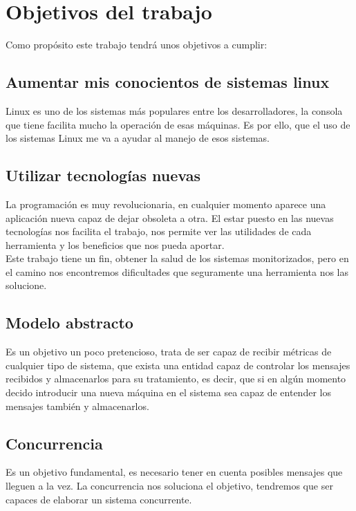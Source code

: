 \documentclass[ spanish, a4paper, 12pt, oneside]{report}
\begin{document}
\section{Objetivos del trabajo}
Como propósito este trabajo tendrá unos objetivos a cumplir:\\

\subsection{Aumentar mis conocientos de sistemas linux}
Linux es uno de los sistemas más populares entre los desarrolladores, la consola que tiene facilita mucho la operación de esas 
máquinas. Es por ello, que el uso de los sistemas Linux me va a ayudar al manejo de esos sistemas.\\

\subsection{Utilizar tecnologías nuevas}
La programación es muy revolucionaria, en cualquier momento aparece una aplicación nueva capaz de dejar obsoleta a otra. 
El estar puesto en las nuevas tecnologías nos facilita el trabajo, nos permite ver las utilidades de cada herramienta y los
beneficios que nos pueda aportar. \\

Este trabajo tiene un fin, obtener la salud de los sistemas monitorizados, pero en el camino nos encontremos dificultades que 
seguramente una herramienta nos las solucione. \\

\subsection{Modelo abstracto}
Es un objetivo un poco pretencioso, trata de ser capaz de recibir métricas de cualquier tipo de sistema, que exista una entidad
capaz de controlar los mensajes recibidos y almacenarlos para su tratamiento, es decir, que si en algún momento decido introducir 
una nueva máquina en el sistema sea capaz de entender los mensajes también y almacenarlos. \\

\subsection{Concurrencia}
Es un objetivo fundamental, es necesario tener en cuenta posibles mensajes que lleguen a la vez. La concurrencia nos soluciona el 
objetivo, tendremos que ser capaces de elaborar un sistema concurrente.\\
\end{document}
